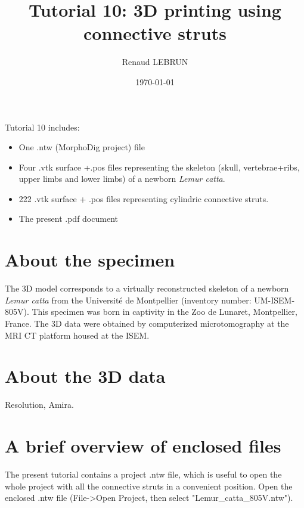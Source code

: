 \documentclass[12pt, a4paper]{book}
\title{Tutorial 10: 3D printing using connective struts}
\author{Renaud LEBRUN}
\affil{Institut des Sciences de l'Evolution, Université de Montpellier, France}
\date{\today}
\begin{document}
	\dominitoc

\maketitle


\faketableofcontents



\minitoc 
Tutorial 10 includes:
\begin{itemize}
\item One .ntw (MorphoDig project) file
\item Four .vtk surface +.pos files representing the skeleton (skull, vertebrae+ribs, upper limbs and lower limbs) of a newborn \textit{Lemur catta}.
\item 222 .vtk surface + .pos files representing cylindric connective struts.
\item The present .pdf document
\end{itemize}



\section{About the specimen}
The 3D model corresponds to a virtually reconstructed skeleton of a newborn \textit{Lemur catta} from the Université de Montpellier (inventory number: UM-ISEM-805V). This specimen was born in captivity in the Zoo de Lunaret, Montpellier, France. The 3D data were obtained by computerized microtomography at the MRI \si{\micro}CT platform housed at the ISEM. 

\section{About the 3D data}
Resolution, Amira.
\section{A brief overview of enclosed files}
		
The present tutorial contains a project .ntw file, which is useful to open the whole project with all the connective struts in a convenient position. Open the enclosed .ntw file (File->Open Project, then select "Lemur\_catta\_805V.ntw"). 
\end{document}
